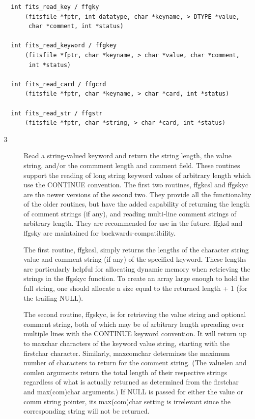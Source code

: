 \documentclass[11pt]{book}
\begin{document}
\begin{verbatim}
  int fits_read_key / ffgky
      (fitsfile *fptr, int datatype, char *keyname, > DTYPE *value,
       char *comment, int *status)

  int fits_read_keyword / ffgkey
      (fitsfile *fptr, char *keyname, > char *value, char *comment,
       int *status)

  int fits_read_card / ffgcrd
      (fitsfile *fptr, char *keyname, > char *card, int *status)

  int fits_read_str / ffgstr
      (fitsfile *fptr, char *string, > char *card, int *status)
\end{verbatim}

\begin{description}
\item[3 ] Read a string-valued keyword and return the string length, the value string, 
    and/or the commment length and comment field.  These routines support the reading
    of long string keyword values of arbitrary length which use the CONTINUE convention.
    The first two routines, ffgkcsl and ffgskyc are the newer versions of the second two.  
    They provide all the functionality of the older routines, 
    but have the added capability of returning the length of comment strings (if any),
    and reading multi-line comment strings of arbitrary length.  They are recommended
    for use in the future.  ffgksl and ffgsky are maintained for backwards-compatibility.
    
    The first routine, ffgkcsl, simply returns the lengths of the character string value and
    comment string (if any) of the specified keyword.  These lengths are particularly helpful
    for allocating dynamic memory when retrieving the strings in the ffgskyc function.
    To create an array large enough to hold the full string, one should allocate a size equal to
    the returned length + 1 (for the trailing NULL).
    
    The second routine, ffgskyc, is for retrieving the value string and optional comment 
    string, both of which may be of arbitrary length spreading over multiple lines with the
    CONTINUE keyword convention.  It will return up to maxchar characters of the keyword value
    string, starting with the firstchar character.  Similarly, maxcomchar determines the 
    maximum number of characters to return for the comment string.  (The valuelen and comlen
    arguments return the total length of their respective strings regardless of what is actually
    returned as determined from the firstchar and max(com)char arguments.) If NULL is passed for 
    either the value or comm string pointer, its max(com)char setting is irrelevant since
    the corresponding string will not be returned.
    

\end{description}
\end{document}
